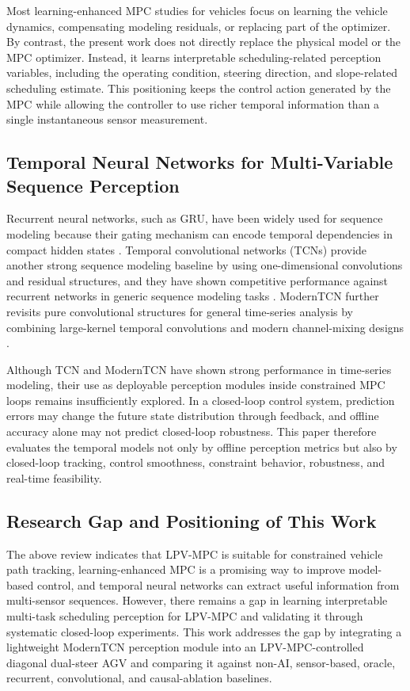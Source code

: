 \documentclass[twocolumn]{article}
\begin{document}
Most learning-enhanced MPC studies for vehicles focus on learning the vehicle dynamics, compensating modeling residuals, or replacing part of the optimizer. By contrast, the present work does not directly replace the physical model or the MPC optimizer. Instead, it learns interpretable scheduling-related perception variables, including the operating condition, steering direction, and slope-related scheduling estimate. This positioning keeps the control action generated by the MPC while allowing the controller to use richer temporal information than a single instantaneous sensor measurement.

\subsection{Temporal Neural Networks for Multi-Variable Sequence Perception}

Recurrent neural networks, such as GRU, have been widely used for sequence modeling because their gating mechanism can encode temporal dependencies in compact hidden states \cite{Cho2014GRU}. Temporal convolutional networks (TCNs) provide another strong sequence modeling baseline by using one-dimensional convolutions and residual structures, and they have shown competitive performance against recurrent networks in generic sequence modeling tasks \cite{Bai2018TCN}. ModernTCN further revisits pure convolutional structures for general time-series analysis by combining large-kernel temporal convolutions and modern channel-mixing designs \cite{Luo2024ModernTCN}.

Although TCN and ModernTCN have shown strong performance in time-series modeling, their use as deployable perception modules inside constrained MPC loops remains insufficiently explored. In a closed-loop control system, prediction errors may change the future state distribution through feedback, and offline accuracy alone may not predict closed-loop robustness. This paper therefore evaluates the temporal models not only by offline perception metrics but also by closed-loop tracking, control smoothness, constraint behavior, robustness, and real-time feasibility.

\subsection{Research Gap and Positioning of This Work}

The above review indicates that LPV-MPC is suitable for constrained vehicle path tracking, learning-enhanced MPC is a promising way to improve model-based control, and temporal neural networks can extract useful information from multi-sensor sequences. However, there remains a gap in learning interpretable multi-task scheduling perception for LPV-MPC and validating it through systematic closed-loop experiments. This work addresses the gap by integrating a lightweight ModernTCN perception module into an LPV-MPC-controlled diagonal dual-steer AGV and comparing it against non-AI, sensor-based, oracle, recurrent, convolutional, and causal-ablation baselines.
\end{document}
